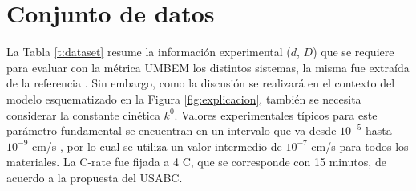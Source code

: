 \section{Conjunto de datos}\label{s:dataset}

La Tabla \ref{t:dataset} resume la información experimental ($d$, $D$) que se 
requiere para evaluar con la métrica UMBEM los distintos sistemas, la misma fue 
extraída de la referencia \cite{xia2022}. Sin embargo, como la discusión se 
realizará en el contexto del modelo esquematizado en la Figura 
\ref{fig:explicacion}, también se necesita considerar la constante cinética $k^0$.
Valores experimentales típicos para este parámetro fundamental se encuentran en 
un intervalo que va desde $10^{-5}$ hasta $10^{-9}$ cm/s \cite{gavilan2020kinetic}, 
por lo cual se utiliza un valor intermedio de $10^{-7}$ cm/s para todos los 
materiales. La C-rate fue fijada a 4 C, que se corresponde con 15 minutos, 
de acuerdo a la propuesta del USABC. 
